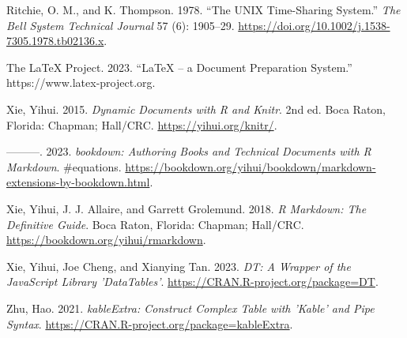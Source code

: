 \begin{CSLReferences}{1}{0}
\leavevmode{}%
Ritchie, O. M., and K. Thompson. 1978. {``The UNIX Time-Sharing System.''} \emph{The Bell System Technical Journal} 57 (6): 1905--29. \url{https://doi.org/10.1002/j.1538-7305.1978.tb02136.x}.

\leavevmode{}%
The LaTeX Project. 2023. {``LaTeX -- a Document Preparation System.''} https://www.latex-project.org.

\leavevmode{}%
Xie, Yihui. 2015. \emph{Dynamic Documents with {R} and Knitr}. 2nd ed. Boca Raton, Florida: Chapman; Hall/CRC. \url{https://yihui.org/knitr/}.

\leavevmode{}%
---------. 2023. \emph{{bookdown: Authoring Books and Technical Documents with R Markdown}}. \#equations. \url{https://bookdown.org/yihui/bookdown/markdown-extensions-by-bookdown.html}.

\leavevmode{}%
Xie, Yihui, J. J. Allaire, and Garrett Grolemund. 2018. \emph{R Markdown: The Definitive Guide}. Boca Raton, Florida: Chapman; Hall/CRC. \url{https://bookdown.org/yihui/rmarkdown}.

\leavevmode{}%
Xie, Yihui, Joe Cheng, and Xianying Tan. 2023. \emph{DT: A Wrapper of the JavaScript Library 'DataTables'}. \url{https://CRAN.R-project.org/package=DT}.

\leavevmode{}%
Zhu, Hao. 2021. \emph{kableExtra: Construct Complex Table with 'Kable' and Pipe Syntax}. \url{https://CRAN.R-project.org/package=kableExtra}.

\end{CSLReferences}



\address{%
Abhishek Ulayil\\
Institute of Actuaries of India (student)\\%
Mumbai, India\\
%
%
\textit{ORCiD: \href{https://orcid.org/0009-0000-6935-8690}{0009-0000-6935-8690}}\\%
\href{mailto:perricoq@outlook.com}{\nolinkurl{perricoq@outlook.com}}%
}

\address{%
Mitch O'Hara-Wild\\
Monash University\\%
Melbourne, Australia\\
%
%
\textit{ORCiD: \href{https://orcid.org/0000-0001-6729-7695}{0000-0001-6729-7695}}\\%
\href{mailto:mail@mitchelloharawild.com}{\nolinkurl{mail@mitchelloharawild.com}}%
}

